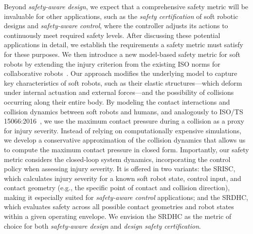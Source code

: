 Beyond \emph{safety-aware design}, we expect that a comprehensive safety metric will be invaluable for other applications, such as the \emph{safety certification} of soft robotic designs and \emph{safety-aware control}, where the controller adjusts its actions to continuously meet required safety levels. After discussing these potential applications in detail, we establish the requirements a safety metric must satisfy for these purposes. We then introduce a new model-based safety metric for soft robots by extending the injury criterion from the existing ISO norms for collaborative robots~\citep{iso2016collaborative}. Our approach modifies the underlying model to capture key characteristics of soft robots, such as their elastic structures—which deform under internal actuation and external forces—and the possibility of collisions occurring along their entire body. By modeling the contact interactions and collision dynamics between soft robots and humans, and analogously to ISO/TS 15066:2016~\citep{iso2016collaborative}, we use the maximum contact pressure during a collision as a proxy for injury severity. Instead of relying on computationally expensive simulations, we develop a conservative approximation of the collision dynamics that allows us to compute the maximum contact pressure in closed form. Importantly, our safety metric considers the closed-loop system dynamics, incorporating the control policy when assessing injury severity. It is offered in two variants: the \gls{SRISC}, which calculates injury severity for a known soft robot state, control input, and contact geometry (e.g., the specific point of contact and collision direction), making it especially suited for \emph{safety-aware control} applications; and the \gls{SRDHC}, which evaluates safety across all possible contact geometries and robot states within a given operating envelope. We envision the \gls{SRDHC} as the metric of choice for both \emph{safety-aware design} and \emph{design safety certification}.